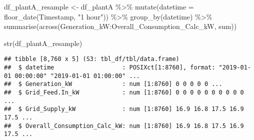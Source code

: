 \documentclass[
]{article}
\newenvironment{Shaded}{\begin{snugshade}}{\end{snugshade}}
\newcommand{\AttributeTok}[1]{\textcolor[rgb]{0.77,0.63,0.00}{#1}}
\newcommand{\CommentTok}[1]{\textcolor[rgb]{0.56,0.35,0.01}{\textit{#1}}}
\newcommand{\FunctionTok}[1]{\textcolor[rgb]{0.00,0.00,0.00}{#1}}
\newcommand{\NormalTok}[1]{#1}
\newcommand{\OtherTok}[1]{\textcolor[rgb]{0.56,0.35,0.01}{#1}}
\newcommand{\SpecialCharTok}[1]{\textcolor[rgb]{0.00,0.00,0.00}{#1}}
\newcommand{\StringTok}[1]{\textcolor[rgb]{0.31,0.60,0.02}{#1}}
\begin{document}
\begin{Shaded}
\end{Shaded}

\begin{Shaded}
\begin{Highlighting}[]
\NormalTok{df\_plantA\_resample }\OtherTok{\textless{}{-}}\NormalTok{ df\_plantA }\SpecialCharTok{\%\textgreater{}\%}
  \FunctionTok{mutate}\NormalTok{(}\AttributeTok{datetime =} \FunctionTok{floor\_date}\NormalTok{(Timestamp, }\StringTok{"1 hour"}\NormalTok{)) }\SpecialCharTok{\%\textgreater{}\%}
  \FunctionTok{group\_by}\NormalTok{(datetime) }\SpecialCharTok{\%\textgreater{}\%}
  \FunctionTok{summarise}\NormalTok{(}\FunctionTok{across}\NormalTok{(Generation\_kW}\SpecialCharTok{:}\NormalTok{Overall\_Consumption\_Calc\_kW, sum))}

\FunctionTok{str}\NormalTok{(df\_plantA\_resample)}
\end{Highlighting}
\end{Shaded}

\begin{verbatim}
## tibble [8,760 x 5] (S3: tbl_df/tbl/data.frame)
##  $ datetime                   : POSIXct[1:8760], format: "2019-01-01 00:00:00" "2019-01-01 01:00:00" ...
##  $ Generation_kW              : num [1:8760] 0 0 0 0 0 ...
##  $ Grid_Feed.In_kW            : num [1:8760] 0 0 0 0 0 0 0 0 0 0 ...
##  $ Grid_Supply_kW             : num [1:8760] 16.9 16.8 17.5 16.9 17.5 ...
##  $ Overall_Consumption_Calc_kW: num [1:8760] 16.9 16.8 17.5 16.9 17.5 ...
\end{verbatim}
\end{document}
